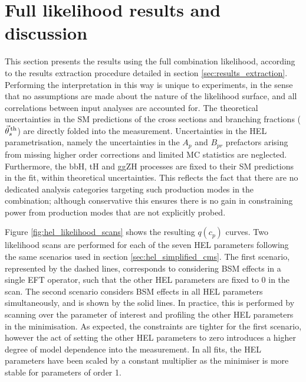 \begin{figure}[htb!]
{  }
  \label{fig:hel_chi2_simplified_1}
\end{figure}

\FloatBarrier
\newpage
\section{Full likelihood results and discussion}\label{sec:eft_results}
This section presents the results using the full combination likelihood, according to the results extraction procedure detailed in section \ref{sec:results_extraction}. Performing the interpretation in this way is unique to experiments, in the sense that no assumptions are made about the nature of the likelihood surface, and all correlations between input analyses are accounted for. The theoretical uncertainties in the SM predictions of the cross sections and branching fractions ($\vec{\theta}^{\,\rm{th}}_{s}$) are directly folded into the measurement. Uncertainties in the HEL parametrisation, namely the uncertainties in the $A_p$ and $B_{pr}$ prefactors arising from missing higher order corrections and limited MC statistics are neglected. Furthermore, the bbH, tH and ggZH processes are fixed to their SM predictions in the fit, within theoretical uncertainties. This reflects the fact that there are no dedicated analysis categories targeting such production modes in the combination; although conservative this ensures there is no gain in constraining power from production modes that are not explicitly probed.

Figure \ref{fig:hel_likelihood_scans} shows the resulting $q(c_p)$ curves. Two likelihood scans are performed for each of the seven HEL parameters following the same scenarios used in section \ref{sec:hel_simplified_cms}. The first scenario, represented by the dashed lines, corresponds to considering BSM effects in a single EFT operator, such that the other HEL parameters are fixed to 0 in the scan. The second scenario considers BSM effects in all HEL parameters simultaneously, and is shown by the solid lines. In practice, this is performed by scanning over the parameter of interest and profiling the other HEL parameters in the minimisation. As expected, the constraints are tighter for the first scenario, however the act of setting the other HEL parameters to zero introduces a higher degree of model dependence into the measurement. In all fits, the HEL parameters have been scaled by a constant multiplier as the minimiser is more stable for parameters of order 1.

